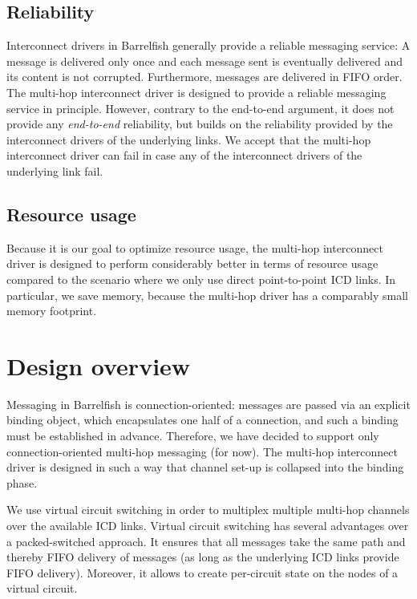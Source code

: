 \documentclass[a4paper,twoside]{report} %
\begin{document}
\subsection{Reliability}

Interconnect drivers in Barrelfish generally provide a reliable messaging service: A message is delivered only once and each message sent is eventually delivered and its content is not corrupted. Furthermore, messages are delivered in FIFO order. The multi-hop interconnect driver is designed to provide a reliable messaging service in principle. However, contrary to the end-to-end argument, it does not provide any \emph{end-to-end} reliability, but builds on the reliability provided by the interconnect drivers of the underlying links. We accept that the multi-hop interconnect driver can fail in case any of the interconnect drivers of the underlying link fail.

\subsection{Resource usage}
Because it is our goal to optimize resource usage, the multi-hop interconnect driver is designed to perform considerably better in terms of resource usage compared to the scenario where we only use direct point-to-point ICD links. In particular, we save memory, because the multi-hop driver has a comparably small memory footprint. 

\section{Design overview}

Messaging in Barrelfish is connection-oriented: messages are passed via an explicit binding object, which encapsulates one half of a connection, and such a binding must be established in advance. Therefore, we have decided to support only connection-oriented multi-hop messaging (for now).  The multi-hop interconnect driver is designed in such a way that channel set-up is collapsed into the binding phase. 

We use virtual circuit switching in order to multiplex multiple multi-hop channels over the available ICD links. Virtual circuit switching has several advantages over a packed-switched approach. It ensures that all messages take the same path and thereby FIFO delivery of messages (as long as the underlying ICD links provide FIFO delivery). Moreover, it allows to create per-circuit state on the nodes of a virtual circuit. 
\end{document}
